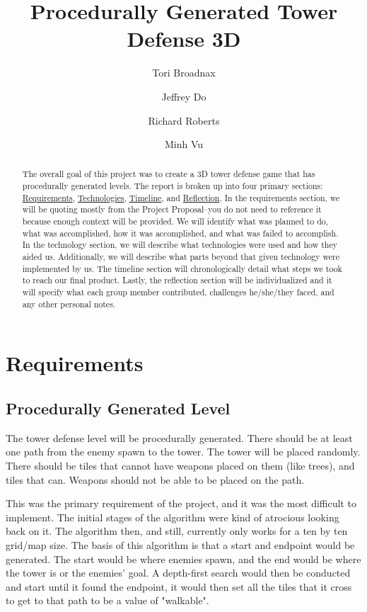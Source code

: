 \documentclass{article}
\title{Procedurally Generated Tower Defense 3D}
\author[1]{Tori Broadnax}
\author[1]{Jeffrey Do}
\author[1]{Richard Roberts}
\author[1]{Minh Vu}
\affil[1]{George Mason University}
\begin{document}
\maketitle

\begin{abstract}
    The overall goal of this project was to create a 3D tower defense game that has procedurally generated levels. The report is broken up into four primary sections: \hyperref[sec:Requirements]{Requirements}, \hyperref[sec:Technologies]{Technologies}, \hyperref[sec:Timeline]{Timeline}, and \hyperref[sec:Reflection]{Reflection}. In the requirements section, we will be quoting mostly from the Project Proposal--you do not need to reference it because enough context will be provided. We will identify what was planned to do, what was accomplished, how it was accomplished, and what was failed to accomplish. In the technology section, we will describe what technologies were used and how they aided us. Additionally, we will describe what parts beyond that given technology were implemented by us. The timeline section will chronologically detail what steps we took to reach our final product. Lastly, the reflection section will be individualized and it will specify what each group member contributed, challenges he/she/they faced, and any other personal notes.
\end{abstract}

\newpage

\tableofcontents

\newpage

\section{Requirements}
\label{sec:Requirements}

\subsection{Procedurally Generated Level}

\begin{displayquote}
    \small
    The tower defense level will be procedurally generated. There should be at least one path from the enemy spawn to the tower. The tower will be placed randomly. There should be tiles that cannot have weapons placed on them (like trees), and tiles that can. Weapons should not be able to be placed on the path.
\end{displayquote}

This was the primary requirement of the project, and it was the most difficult to implement. The initial stages of the algorithm were kind of atrocious looking back on it. The algorithm then, and still, currently only works for a ten by ten grid/map size. The basis of this algorithm is that a start and endpoint would be generated. The start would be where enemies spawn, and the end would be where the tower is or the enemies' goal. A depth-first search would then be conducted and start until it found the endpoint, it would then set all the tiles that it cross to get to that path to be a value of "walkable".
\end{document}
